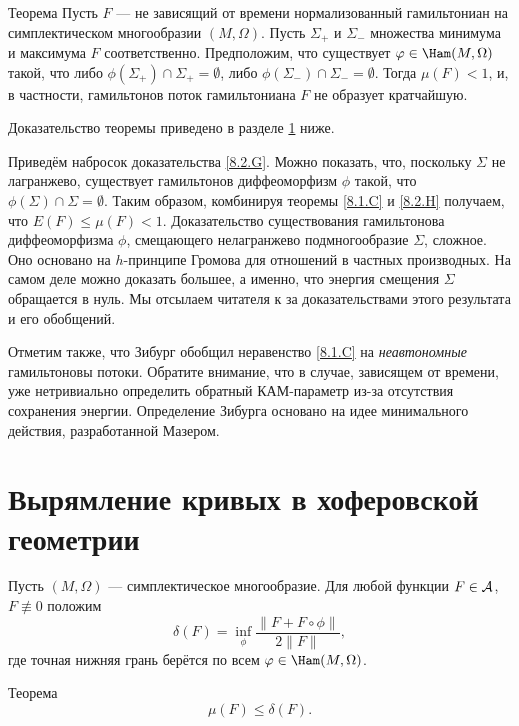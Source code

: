 \begin{thm}{Теорема}\label{8.2.H}
Пусть $F$ --- не зависящий от времени нормализованный гамильтониан на
симплектическом многообразии $ (M, \Omega)$. 
Пусть $\Sigma_+$  и $\Sigma_-$ 
  множества минимума и максимума $F$ соответственно.
Предположим, что существует $\phi \in \Ham (M, \Omega)$ такой, что
либо $\phi (\Sigma_+) \cap \Sigma_+ = \emptyset$, либо $\phi
(\Sigma_-) \cap \Sigma_- = \emptyset$. 
Тогда $\mu (F) <1$, и, в частности, гамильтонов поток
гамильтониана $F$ не образует
кратчайшую.  
\end{thm}

Доказательство теоремы приведено в разделе \ref{sec:8.3} ниже.

Приведём набросок доказательства \ref{8.2.G}.
Можно показать, что, поскольку $\Sigma$ не лагранжево, существует
гамильтонов диффеоморфизм $\phi$ такой, что $\phi (\Sigma) \cap \Sigma
= \emptyset$. 
Таким образом, комбинируя теоремы \ref{8.1.C} и \ref{8.2.H} получаем,
что $E (F) \le \mu (F) <1$. 
Доказательство существования гамильтонова диффеоморфизма $\phi$,
смещающего нелагранжево подмногообразие $\Sigma$, сложное. 
Оно основано на $h$-принципе Громова для отношений в частных производных.
На самом деле можно доказать большее, а именно, что энергия смещения
$\Sigma$ обращается в нуль. 
Мы отсылаем читателя к \cite{P2,LS} за доказательствами этого
результата и его обобщений. 

Отметим также, что Зибург \cite{Si2} обобщил неравенство \ref{8.1.C}
на {}\emph{неавтономные} гамильтоновы потоки. 
Обратите внимание, что в случае, зависящем от времени, уже
нетривиально определить обратный КАМ-параметр из-за отсутствия
сохранения энергии. 
Определение Зибурга основано на идее минимального действия,
разработанной Мазером. 

\section{Вырямление кривых в хоферовской геометрии}\label{sec:8.3}

Пусть $(M, \Omega)$ --- симплектическое многообразие.
Для любой функции $F \in \mathcal{A}$, $F \not\equiv 0$ положим 
\[\delta(F)=\inf_\phi \frac{\|F+ F \circ \phi\|}{2\|F\|},\]
где точная нижняя грань берётся по всем $\phi \in \Ham (M, \Omega)$.

\begin{thm}[(\cite{BP2})]{Теорема}\label{8.3.A}
\[\mu (F) \le \delta (F).\]
\end{thm}

